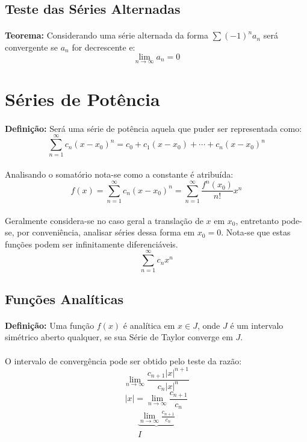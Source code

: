 \documentclass{article}
\begin{document}
    \subsection{Teste das Séries Alternadas}
        \paragraph{}\textbf{Teorema:} Considerando uma série alternada da forma $\sum {(-1)}^{n}a_{n}$ será convergente se $a_{n}$ for decrescente e:
            \[\lim_{n\to\infty}a_{n}=0\]
            
    \section{Séries de Potência}
        \paragraph{}\textbf{Definição:} Será uma série de potência aquela que puder ser representada como:
            \[\sum\limits_{n=1}^{\infty}c_{n}{(x-x_{0})}^{n}=c_{0}+c_{1}{(x-x_{0})}+\cdots+c_{n}{(x-x_{0})}^{n}\]
        \paragraph{}Analisando o somatório nota-se como a constante é atribuída:
            \[f(x)=\sum\limits_{n=1}^{\infty}c_{n}{(x-x_{0})}^{n}=\sum\limits_{n=1}^{\infty}\frac{f^{n}(x_{0})}{n!}{x}^{n}\]
        \paragraph{}Geralmente considera-se no caso geral a translação de $x$ em $x_{0}$, entretanto pode-se, por conveniência, analisar séries dessa forma em $x_{0}=0$. Nota-se que estas funções podem ser infinitamente diferenciáveis.
            \[\sum\limits_{n=1}^{\infty}c_{n}{x}^{n}\]
            
    \subsection{Funções Analíticas}
        \paragraph{}\textbf{Definição:} Uma função $f(x)$ é analítica em $x\in J$, onde $J$ é um intervalo simétrico aberto qualquer, se sua Série de Taylor converge em $J$.
        \paragraph{}O intervalo de convergência pode ser obtido pelo teste da razão:
            \[\lim_{n\to\infty}\frac{c_{n+1}{|x|}^{n+1}}{c_{n}{|x|}^{n}}\]
            \[|x|=\lim_{n\to\infty}\frac{c_{n+1}}{c_{n}}\]
            \[\begin{matrix} \underbrace{\lim_{n\to\infty}\frac{c_{n+1}}{c_{n}}}\\I\end{matrix}\]
\end{document}
